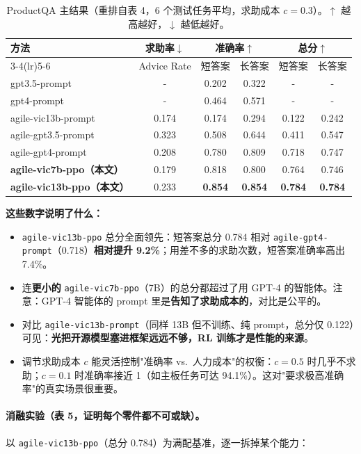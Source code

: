 \documentclass[11pt,UTF8,fontset=fandol]{ctexart}
\begin{document}
\begin{table}[H]\centering
\caption{ProductQA 主结果（重排自表 4，6 个测试任务平均，求助成本 $c=0.3$）。$\uparrow$ 越高越好，$\downarrow$ 越低越好。}
\label{tab:productqa}
\small
\begin{tabular}{lccccc}
\toprule
\multirow{2}{*}{方法} & 求助率$\downarrow$ & \multicolumn{2}{c}{准确率$\uparrow$} & \multicolumn{2}{c}{总分$\uparrow$} \\
\cmidrule(lr){3-4}\cmidrule(lr){5-6}
 & Advice Rate & 短答案 & 长答案 & 短答案 & 长答案 \\ \midrule
gpt3.5-prompt          & -     & 0.202 & 0.322 & -     & -     \\
gpt4-prompt            & -     & 0.464 & 0.571 & -     & -     \\
agile-vic13b-prompt    & 0.174 & 0.174 & 0.294 & 0.122 & 0.242 \\
agile-gpt3.5-prompt    & 0.323 & 0.508 & 0.644 & 0.411 & 0.547 \\
agile-gpt4-prompt      & 0.208 & 0.780 & 0.809 & 0.718 & 0.747 \\
\textbf{agile-vic7b-ppo（本文）}  & 0.179 & 0.818 & 0.800 & 0.764 & 0.746 \\
\textbf{agile-vic13b-ppo（本文）} & 0.233 & \textbf{0.854} & \textbf{0.854} & \textbf{0.784} & \textbf{0.784} \\
\bottomrule
\end{tabular}
\end{table}

\textbf{这些数字说明了什么：}
\begin{itemize}[leftmargin=1.5em]
\item \texttt{agile-vic13b-ppo} 总分全面领先：短答案总分 0.784 相对 \texttt{agile-gpt4-prompt}（0.718）\textbf{相对提升 9.2\%}；用差不多的求助次数，短答案准确率高出 7.4\%。
\item 连\textbf{更小的} \texttt{agile-vic7b-ppo}（7B）的总分都超过了用 GPT-4 的智能体。注意：GPT-4 智能体的 prompt 里是\textbf{告知了求助成本的}，对比是公平的。
\item 对比 \texttt{agile-vic13b-prompt}（同样 13B 但不训练、纯 prompt，总分仅 0.122）可见：\textbf{光把开源模型塞进框架远远不够，RL 训练才是性能的来源}。
\item 调节求助成本 $c$ 能灵活控制"准确率 vs.\ 人力成本"的权衡：$c=0.5$ 时几乎不求助；$c=0.1$ 时准确率接近 1（如主板任务可达 94.1\%）。这对"要求极高准确率"的真实场景很重要。
\end{itemize}

\paragraph{消融实验（表 5，证明每个零件都不可或缺）。} 以 \texttt{agile-vic13b-ppo}（总分 0.784）为满配基准，逐一拆掉某个能力：
\end{document}
